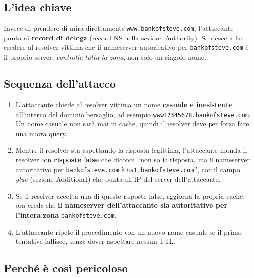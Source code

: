 \documentclass{article}
\begin{document}
\subsection*{L'idea chiave}

Invece di prendere di mira direttamente \texttt{www.bankofsteve.com},
l'attaccante punta ai \textbf{record di delega} (record NS nella sezione
Authority). Se riesce a far credere al resolver vittima che il nameserver
autoritativo per \texttt{bankofsteve.com} è il proprio server, \emph{controlla
tutta la zona}, non solo un singolo nome.

\subsection*{Sequenza dell'attacco}

\begin{enumerate}[label=\Circled{\arabic*}]
    \item L'attaccante chiede al resolver vittima un nome \textbf{casuale e
        inesistente} all'interno del dominio bersaglio, ad esempio
        \texttt{www12345678.bankofsteve.com}. Un nome casuale non sarà mai
        in cache, quindi il resolver deve per forza fare una nuova query.

    \item Mentre il resolver sta aspettando la risposta legittima,
        l'attaccante inonda il resolver con \textbf{risposte false} che
        dicono: ``non so la risposta, ma il nameserver autoritativo per
        \texttt{bankofsteve.com} è \texttt{ns1.bankofsteve.com}'', con il
        campo \emph{glue} (sezione Additional) che punta all'IP del server
        dell'attaccante.

    \item Se il resolver accetta una di queste risposte false, aggiorna la
        propria cache: ora crede che \textbf{il nameserver dell'attaccante
        sia autoritativo per l'intera zona} \texttt{bankofsteve.com}.

    \item L'attaccante ripete il procedimento con un nuovo nome casuale se
        il primo tentativo fallisce, senza dover aspettare nessun TTL.
\end{enumerate}

\subsection*{Perché è così pericoloso}
\end{document}
